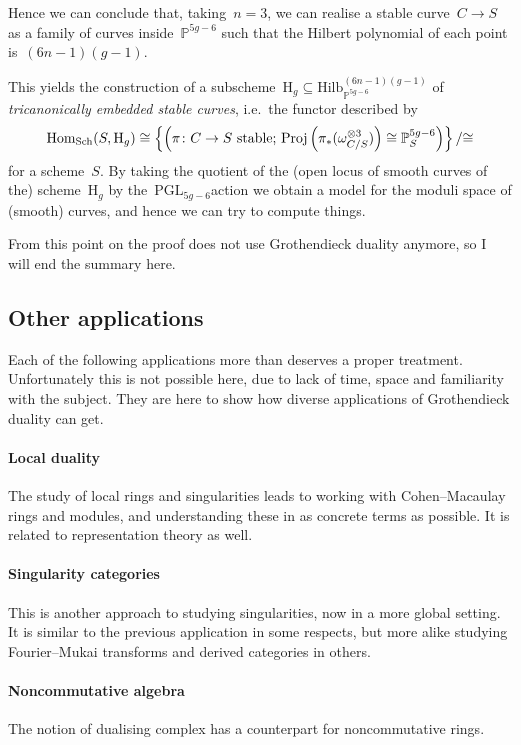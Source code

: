 \documentclass[10pt,a4paper]{article}
\begin{document}
Hence we can conclude that, taking~$n=3$, we can realise a stable curve~$C\to S$ as a family of curves inside~$\mathbb{P}^{5g-6}$ such that the Hilbert polynomial of each point is~$(6n-1)(g-1)$.

This yields the construction of a subscheme~$\mathrm{H}_g\subseteq\mathrm{Hilb}_{\mathbb{P}^{5g-6}}^{(6n-1)(g-1)}$ of \emph{tricanonically embedded stable curves}, i.e.\ the functor described by
\begin{equation}
  \operatorname{Hom}_{\mathrm{Sch}}(S,\mathrm{H}_g)\cong\left\{ \left( \text{$\pi\colon C\to S$ stable; $\operatorname{Proj}\left( \pi_*(\omega_{C/S}^{\otimes 3}) \right)\cong\mathbb{P}_S^{5g-6}$} \right) \right\}/{\cong}
\end{equation}
for a scheme~$S$. By taking the quotient of the (open locus of smooth curves of the) scheme~$\mathrm{H}_g$ by the~$\mathrm{PGL}_{5g-6}$\dash action we obtain a model for the moduli space of (smooth) curves, and hence we can try to compute things.

From this point on the proof does not use Grothendieck duality anymore, so I will end the summary here.


\subsection{Other applications}
Each of the following applications more than deserves a proper treatment. Unfortunately this is not possible here, due to lack of time, space and familiarity with the subject. They are here to show how diverse applications of Grothendieck duality can get.

\paragraph{Local duality}
The study of local rings and singularities leads to working with Cohen--Macaulay rings and modules, and understanding these in as concrete terms as possible. It is related to representation theory as well.

\paragraph{Singularity categories}
This is another approach to studying singularities, now in a more global setting. It is similar to the previous application in some respects, but more alike studying Fourier--Mukai transforms and derived categories in others.

\paragraph{Noncommutative algebra}
The notion of dualising complex has a counterpart for noncommutative rings.
\end{document}
